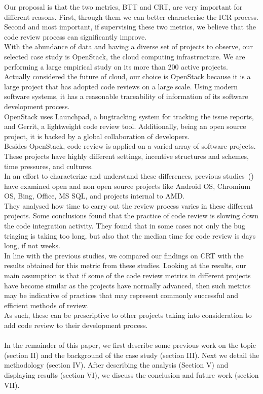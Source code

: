 \documentclass[10pt, conference]{IEEEtran}
\begin{document}
Our proposal is that the two metrics, BTT and CRT, are very important for different reasons. 
First, through them we can better characterise the ICR process. 
Second and most important, if supervising these two metrics, we believe that 
the code review process can significantly improve.
\\
With the abundance of data and having a diverse set of projects to observe,
our selected case study is OpenStack, the cloud computing infrastructure. 
We are performing a large empirical study on its more than 200 active projects.
\\
Actually considered the future of cloud, 
our choice is OpenStack because it is a large project that has adopted code
reviews on a large scale. Using modern software systems, it has a reasonable traceability 
of information of its software development process.
\\
OpenStack uses Launchpad, a bugtracking system for tracking
the issue reports, and Gerrit, a lightweight code review tool. 
Additionally, being an open source project, it is backed by a global collaboration
of developers.
\\
Besides OpenStack, code review is applied on a varied array of software projects. 
These projects have highly different settings, incentive structures and schemes, 
time pressures, and cultures.
\\
In an effort to characterize and understand these differences, previous studies~(\cite{bib01,bib02,bib03}) 
have examined open and non open source projects like Android OS, Chromium OS, Bing, Office, MS SQL, 
and projects internal to AMD. 
\\
They analysed how time to carry out the review process varies in these different projects. 
Some conclusions found that the practice of code review is slowing down the code integration activity. 
They found that in some cases not only the bug triaging is taking too long, but also that the median time 
for code review is days long, if not weeks.
\\
In line with the previous studies, we compared our findings on CRT with the results obtained for this 
metric from these studies.
Looking at the results, our main assumption is that if some of the code review metrics in different projects have become 
similar as the projects have normally advanced, then such metrics may be indicative of practices 
that may represent commonly successful and efficient methods of review.
\\
As such, these can be prescriptive to other projects taking into consideration to add code 
review to their development process.
\\
\\
In the remainder of this paper, we first describe some previous work on the topic (section II) and 
the background of the case study (section III). Next we detail the methodology (section IV). After  
describing the analysis (Section V) and displaying results (section VI), we discuss the conclusion and future work 
(section VII).
%
%
\end{document}
